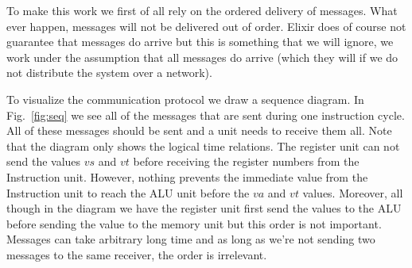 \documentclass[a4paper,11pt]{article}
\begin{document}
To make this work we first of all rely on the ordered delivery of
messages. What ever happen, messages will not be delivered out of
order. Elixir does of course not guarantee that messages do arrive but
this is something that we will ignore, we work under the assumption
that all messages do arrive (which they will if we do not distribute
the system over a network).

To visualize the communication protocol we draw a sequence diagram. In
Fig.~\ref{fig:seq} we see all of the messages that are sent during one
instruction cycle. All of these messages should be sent and a unit
needs to receive them all. Note that the diagram only shows the
logical time relations. The register unit can not send the values $vs$
and $vt$ before receiving the register numbers from the Instruction
unit. However, nothing prevents the immediate value from the
Instruction unit to reach the ALU unit before the $va$ and $vt$
values. Moreover, all though in the diagram we have the register unit
first send the values to the ALU before sending the value to the
memory unit but this order is not important. Messages can take
arbitrary long time and as long as we're not sending two messages to
the same receiver, the order is irrelevant. 
\end{document}
